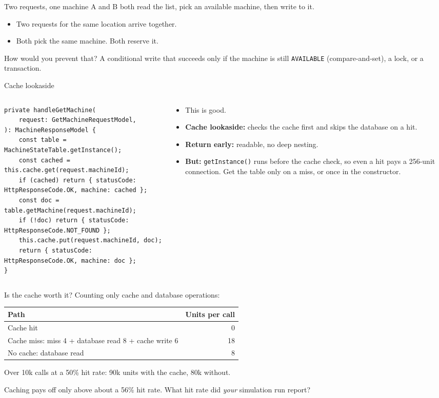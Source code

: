 \documentclass[aspectratio=169]{beamer}
\newenvironment{sample}[1]
  {\samplelabel{#1}\begin{columns}[T]\begin{column}{0.66\textwidth}}
  {\end{column}\end{columns}}
\newcommand{\review}{\end{column}\begin{column}{0.31\textwidth}\footnotesize}
\begin{document}
\begin{frame}{Two requests, one machine}
  A and B both read the list, pick an available machine, then write to it.
  \pause
  \begin{itemize}
    \item Two requests for the same location arrive together.
    \item Both pick the same machine. Both reserve it.
  \end{itemize}
  \pause
  \alert{How would you prevent that?} A conditional write that succeeds only if the machine is
  still \texttt{AVAILABLE} (compare-and-set), a lock, or a transaction.
\end{frame}

\begin{frame}[fragile]{Cache lookaside}
\begin{sample}{C}
\begin{lstlisting}
private handleGetMachine(
    request: GetMachineRequestModel,
): MachineResponseModel {
    const table = MachineStateTable.getInstance();
    const cached = this.cache.get(request.machineId);
    if (cached) return { statusCode: HttpResponseCode.OK, machine: cached };
    const doc = table.getMachine(request.machineId);
    if (!doc) return { statusCode: HttpResponseCode.NOT_FOUND };
    this.cache.put(request.machineId, doc);
    return { statusCode: HttpResponseCode.OK, machine: doc };
}
\end{lstlisting}
\review
\begin{itemize}
  \item<2-> \alert{This is good.}
  \item<3-> \textbf{Cache lookaside:} checks the cache first and skips the database on a hit.
  \item<4-> \textbf{Return early:} readable, no deep nesting.
  \item<5-> \textbf{But:} \texttt{getInstance()} runs before the cache check, so even a hit
    pays a 256-unit connection. Get the table only on a miss, or once in the constructor.
\end{itemize}
\end{sample}
\end{frame}

\begin{frame}{Is the cache worth it?}
  \centering
  {\small Counting only cache and database operations:}\par\smallskip
  \begin{tabular}{@{}lr@{}}
    \toprule
    Path & Units per call \\
    \midrule
    Cache hit & 0 \\
    Cache miss: miss 4 + database read 8 + cache write 6 & 18 \\
    No cache: database read & 8 \\
    \bottomrule
  \end{tabular}

  \bigskip
  \raggedright
  \pause
  Over 10k calls at a 50\% hit rate: \alert{90k units with the cache, 80k without.}

  \pause
  Caching pays off only above about a 56\% hit rate.
  What hit rate did \emph{your} simulation run report?
\end{frame}
\end{document}
